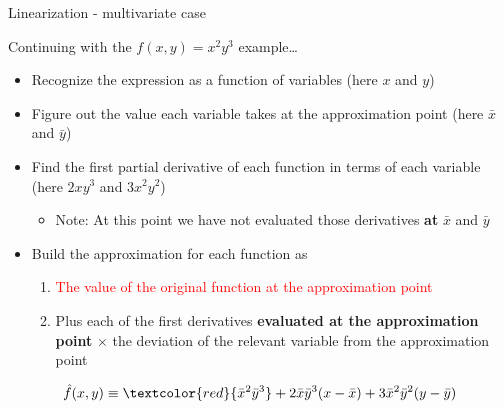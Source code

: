 \begin{frame}{Linearization - multivariate case}

Continuing with the $f(x,y) = x^{2} y^{3}$ example\ldots

\begin{itemize}
\item	Recognize the expression as a function of variables (here $x$ and $y$)
\item	Figure out the value each variable takes at the approximation point (here $\bar{x}$ and $\bar{y}$)
\item	Find the first partial derivative of each function in terms of each variable (here $2xy^{3}$ and $3x^{2}y^{2}$)
	\begin{itemize}
	\item	Note: At this point we have not evaluated those derivatives \textbf{at} $\bar{x}$ and $\bar{y}$
	\end{itemize}
\item	Build the approximation for each function as
	\begin{enumerate}
	\item	\textcolor{red}{The value of the original function at the approximation point}
	\item	Plus each of the first derivatives \textbf{evaluated at the approximation point} $\times$ the deviation of the relevant variable from the approximation point
	\end{enumerate}
\end{itemize}
\[
 \hat{f}(x,y) \equiv \textcolor{red}{\bar{x}^{2} \bar{y}^{3}} +  2\bar{x}\bar{y}^{3}(x-\bar{x}) + 3\bar{x}^{2}\bar{y}^{2}(y-\bar{y})
\]
\end{frame}



